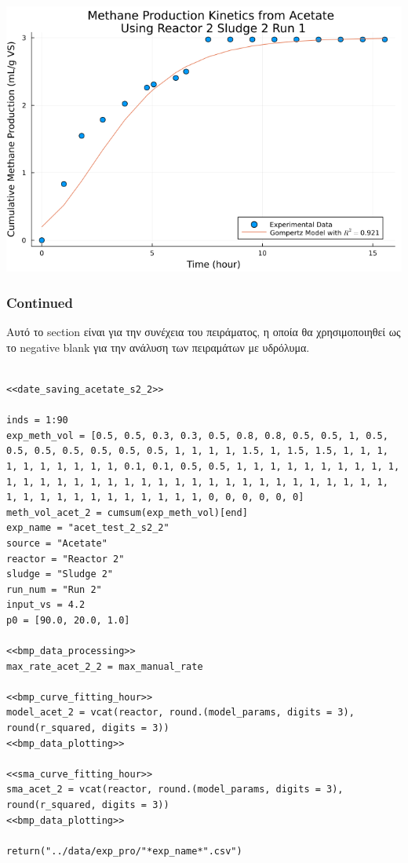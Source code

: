 \documentclass[11pt]{article}
\begin{document}
\begin{center}
\includegraphics[width=.9\linewidth]{../plots/BMPs/Acetate/specific_methane_kinetics_acet_test_2_s2_min.png}
\end{center}

\subsubsection{Continued}
\label{sec:orgbf1b131}
Αυτό το section είναι για την συνέχεια του πειράματος, η οποία θα χρησιμοποιηθεί ως το negative blank για την ανάλυση των πειραμάτων με υδρόλυμα.

\begin{verbatim}

<<date_saving_acetate_s2_2>>

inds = 1:90
exp_meth_vol = [0.5, 0.5, 0.3, 0.3, 0.5, 0.8, 0.8, 0.5, 0.5, 1, 0.5, 0.5, 0.5, 0.5, 0.5, 0.5, 0.5, 1, 1, 1, 1, 1.5, 1, 1.5, 1.5, 1, 1, 1, 1, 1, 1, 1, 1, 1, 1, 0.1, 0.1, 0.5, 0.5, 1, 1, 1, 1, 1, 1, 1, 1, 1, 1, 1, 1, 1, 1, 1, 1, 1, 1, 1, 1, 1, 1, 1, 1, 1, 1, 1, 1, 1, 1, 1, 1, 1, 1, 1, 1, 1, 1, 1, 1, 1, 1, 1, 1, 1, 0, 0, 0, 0, 0, 0]
meth_vol_acet_2 = cumsum(exp_meth_vol)[end]
exp_name = "acet_test_2_s2_2"
source = "Acetate"
reactor = "Reactor 2"
sludge = "Sludge 2"
run_num = "Run 2"
input_vs = 4.2
p0 = [90.0, 20.0, 1.0]

<<bmp_data_processing>>
max_rate_acet_2_2 = max_manual_rate

<<bmp_curve_fitting_hour>>
model_acet_2 = vcat(reactor, round.(model_params, digits = 3), round(r_squared, digits = 3))
<<bmp_data_plotting>>

<<sma_curve_fitting_hour>>
sma_acet_2 = vcat(reactor, round.(model_params, digits = 3), round(r_squared, digits = 3))  
<<bmp_data_plotting>>

return("../data/exp_pro/"*exp_name*".csv")

\end{verbatim}
\end{document}
